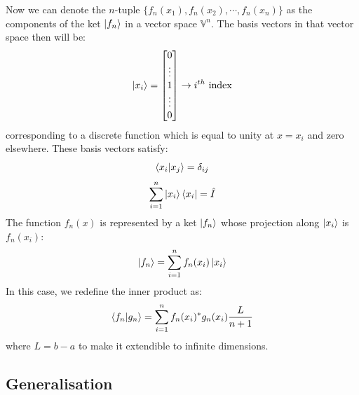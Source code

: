 \documentclass[12pt,a4paper]{report}
\newcommand{\vecspace}[1]{\mathbb{#1}}
\begin{document}
Now we can denote the $n$-tuple $\{f_n(x_1), f_n(x_2), \cdots, f_n(x_n)\}$ as the components of the ket $\ket{f_n}$ in a vector space $\vecspace{V}^n$.
The basis vectors in that vector space then will be:
\begin{equation*}
    \ket{x_i} = \begin{bmatrix}
        0 \\ \vdots \\ 1 \\ \vdots \\ 0
    \end{bmatrix} \rightarrow i^{th} \text{ index}
\end{equation*}
corresponding to a discrete function which is equal to unity at $x = x_i$ and zero elsewhere. These basis vectors satisfy:
\begin{equation*}
    \bra{x_i}\ket{x_j} = \delta_{ij}
\end{equation*}
\begin{equation*}
    \sum_{i=1}^n \ket{x_i}\bra{x_i} = \hat{I}
\end{equation*}
The function $f_n(x)$ is represented by a ket $\ket{f_n}$ whose projection along $\ket{x_i}$ is $f_n(x_i)$:
\begin{equation*}
    \ket{f_n} = \sum_{i=1}^n f_n(x_i)\ket{x_i}
\end{equation*}
In this case, we redefine the inner product as:
\begin{equation*}
    \bra{f_n}\ket{g_n} = \sum_{i=1}^n f_n(x_i)^* g_n(x_i) \frac{L}{n+1}
\end{equation*}
where $L = b-a$ to make it extendible to infinite dimensions.

\subsection{Generalisation}
\end{document}
